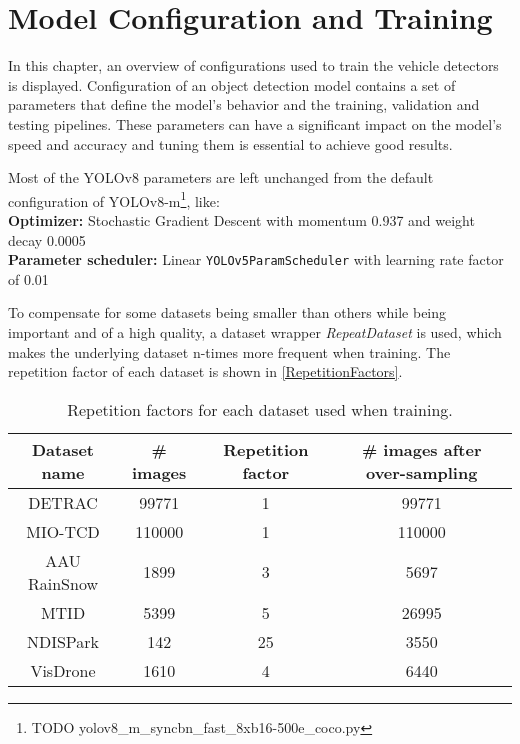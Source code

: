 



\chapter{Model Configuration and Training}

In this chapter, an overview of configurations used to train the vehicle
detectors is displayed. Configuration of an object detection model contains a
set of parameters that define the model's behavior and the training, validation
and testing pipelines. These parameters can have a significant impact on the
model's speed and accuracy and tuning them is essential to achieve good results.

Most of the YOLOv8 parameters are left unchanged from the default configuration
of YOLOv8-m\footnote{TODO yolov8\_m\_syncbn\_fast\_8xb16-500e\_coco.py}, like: \\
\textbf{Optimizer:} Stochastic Gradient Descent with momentum \num{0.937} and weight decay \num{0.0005} \\
\textbf{Parameter scheduler:} Linear \verb|YOLOv5ParamScheduler| with learning rate factor of 0.01

To compensate for some datasets being smaller than others while being important
and of a high quality, a dataset wrapper \textit{RepeatDataset} is used, which
makes the underlying dataset n-times more frequent when training. The repetition
factor of each dataset is shown in \autoref{RepetitionFactors}.

\begin{table}[h]
\centering
\label{RepetitionFactors}
\small
\begin{tabular}{|c|c|c|c|}
    \hline
    Dataset name & \# images & Repetition factor & \# images after over-sampling \\
    \hline
    DETRAC       &  \num{99771} &  1 & \num{99771} \\
    MIO-TCD      & \num{110000} &  1 & \num{110000} \\
    AAU RainSnow &   \num{1899} &  3 & \num{5697} \\
    MTID         &   \num{5399} &  5 & \num{26995} \\
    NDISPark     &    \num{142} & 25 & \num{3550} \\
    VisDrone     &   \num{1610} &  4 & \num{6440} \\
    \hline
\end{tabular}
\caption{Repetition factors for each dataset used when training.}
\end{table}

